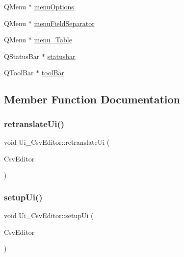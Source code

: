\begin{DoxyCompactItemize}
Q\+Menu $\ast$ \mbox{\hyperlink{class_ui___csv_editor_ac901fda62fb9497d4ab9ba2f36d11aeb}{menu\+Options}}
\item 
Q\+Menu $\ast$ \mbox{\hyperlink{class_ui___csv_editor_a3caa82efe57c3f60f04e211ab9c07f8a}{menu\+Field\+Separator}}
\item 
Q\+Menu $\ast$ \mbox{\hyperlink{class_ui___csv_editor_a9a54d3ef2af55666101551fa55ff7dc3}{menu\+\_\+\+Table}}
\item 
Q\+Status\+Bar $\ast$ \mbox{\hyperlink{class_ui___csv_editor_a5092de1af1e7615ac97eb3c43b7e7e33}{statusbar}}
\item 
Q\+Tool\+Bar $\ast$ \mbox{\hyperlink{class_ui___csv_editor_a0148a52976ad2e51f87f10d42c87d3c9}{tool\+Bar}}
\end{DoxyCompactItemize}


\subsection{Member Function Documentation}
\mbox{\label{class_ui___csv_editor_ad24413d2ab738a4441dbb2ebd61c185a}} 
\subsubsection{\texorpdfstring{retranslateUi()}{retranslateUi()}}
{\footnotesize\ttfamily void Ui\+\_\+\+Csv\+Editor\+::retranslate\+Ui (\begin{DoxyParamCaption}\item[{Q\+Main\+Window $\ast$}]{Csv\+Editor }\end{DoxyParamCaption})\hspace{0.3cm}{\ttfamily [inline]}}

\mbox{\label{class_ui___csv_editor_ad8ae324ce02bba98c60dbb7d59fbc739}} 
\subsubsection{\texorpdfstring{setupUi()}{setupUi()}}
{\footnotesize\ttfamily void Ui\+\_\+\+Csv\+Editor\+::setup\+Ui (\begin{DoxyParamCaption}\item[{Q\+Main\+Window $\ast$}]{Csv\+Editor }\end{DoxyParamCaption})\hspace{0.3cm}{\ttfamily [inline]}}



